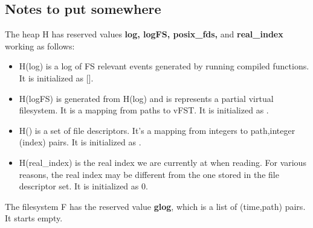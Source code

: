 \subsection*{Notes to put somewhere}
The heap H has reserved values \textbf{log, logFS, posix\_fds,} and \textbf{real\_index} working as follows: \\
\begin{itemize}
\item H(log) is a log of FS relevant events generated by running compiled functions. 
It is initialized as [].
\item H(logFS) is generated from H(log) and is represents a partial virtual filesystem.
It is a mapping from paths to vFST. It is initialized as \GOOSE{}.
\item H(\pfds) is a set of file descriptors. 
It's a mapping from integers to path,integer (index) pairs.
It is initialized as \GOOSE{}.
\item H(real\_index) is the real index we are currently at when reading.
For various reasons, the real index may be different from the one stored in
the file descriptor set.
It is initialized as 0.
\end{itemize}
The filesystem F has the reserved value \textbf{glog}, which is a list of (time,path) pairs. It starts empty.
